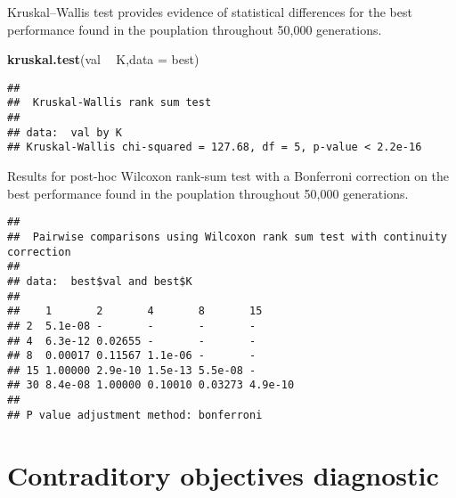 \documentclass[]{book}
\newenvironment{Shaded}{\begin{snugshade}}{\end{snugshade}}
\newcommand{\DataTypeTok}[1]{\textcolor[rgb]{0.13,0.29,0.53}{#1}}
\newcommand{\KeywordTok}[1]{\textcolor[rgb]{0.13,0.29,0.53}{\textbf{#1}}}
\newcommand{\NormalTok}[1]{#1}
\newcommand{\OperatorTok}[1]{\textcolor[rgb]{0.81,0.36,0.00}{\textbf{#1}}}
\newcommand{\OtherTok}[1]{\textcolor[rgb]{0.56,0.35,0.01}{#1}}
\newcommand{\StringTok}[1]{\textcolor[rgb]{0.31,0.60,0.02}{#1}}
\begin{document}
Kruskal--Wallis test provides evidence of statistical differences for the best performance found in the pouplation throughout 50,000 generations.

\begin{Shaded}
\begin{Highlighting}[]
\KeywordTok{kruskal.test}\NormalTok{(val }\OperatorTok{~}\StringTok{ }\NormalTok{K,}\DataTypeTok{data =}\NormalTok{ best)}
\end{Highlighting}
\end{Shaded}

\begin{verbatim}
## 
##  Kruskal-Wallis rank sum test
## 
## data:  val by K
## Kruskal-Wallis chi-squared = 127.68, df = 5, p-value < 2.2e-16
\end{verbatim}

Results for post-hoc Wilcoxon rank-sum test with a Bonferroni correction on the best performance found in the pouplation throughout 50,000 generations.

\begin{Shaded}
\end{Shaded}

\begin{verbatim}
## 
##  Pairwise comparisons using Wilcoxon rank sum test with continuity correction 
## 
## data:  best$val and best$K 
## 
##    1       2       4       8       15     
## 2  5.1e-08 -       -       -       -      
## 4  6.3e-12 0.02655 -       -       -      
## 8  0.00017 0.11567 1.1e-06 -       -      
## 15 1.00000 2.9e-10 1.5e-13 5.5e-08 -      
## 30 8.4e-08 1.00000 0.10010 0.03273 4.9e-10
## 
## P value adjustment method: bonferroni
\end{verbatim}

\hypertarget{contraditory-objectives-diagnostic-4}{%
\section{Contraditory objectives diagnostic}\label{contraditory-objectives-diagnostic-4}}
\end{document}
